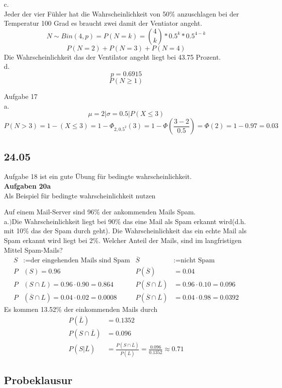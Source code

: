 c.\\

Jeder der vier Fühler hat die Wahrscheinlichkeit von 50$\%$ anzuschlagen bei der Temperatur 100 Grad es braucht zwei damit der Ventiator angeht.
\[N\sim Bin(4,p)=P(N=k)=\binom{4}{k}*0.5^k*0.5^{4-k}\]
\[P(N=2)+P(N=3)+P(N=4)\]
Die Wahrscheinlichkeit das der Ventilator angeht liegt bei 43.75 Prozent.\\

d.\\

\[p=0.6915\]\[ P(N\geq 1)\]

Aufgabe 17\\
a.\\
\[\mu =2 \vert \sigma =0.5 \vert P(X\leq 3)\]
\[P(N>3) = 1-(X\leq 3)= 1-\Phi _{2,0.5^2}(3)=1-\Phi (\frac{3-2}{0.5} )=\Phi (2)=1-0.97=0.03\]

\subsection{24.05}
Aufgabe 18 ist ein gute Übung für bedingte wahrscheinlichkeit.\\
\textbf{Aufgaben 20a}\\
Als Beispiel für bedingte wahrscheinlichkeit nutzen

Auf einem Mail-Server sind 96\% der ankommenden Mails Spam.\\
a.$)$Die Wahrscheinlichkeit liegt bei 90\% das eine Mail als Spam erkannt wird(d.h. mit 10\% das der Spam durch geht). Die Wahrscheinlichkeit das ein echte Mail als Spam erkannt wird liegt bei 2\%. Welcher Anteil der Mails, sind im langfristigen Mittel Spam-Mails?
\begin{align*}
    S&:= \textrm{der eingehenden Mails sind Spam} &\overline{S}&:= \textrm{nicht Spam}\\
    P&(S)=0.96 &P(\overline{S})&=0.04\\
    P&(S\cap L)= 0.96\cdot 0.90=0.864  &P(S\cap\overline{L})&=0.96\cdot0.10 = 0.096\\
    P&(\overline{S}\cap L)= 0.04\cdot 0.02 = 0.0008 &P(\overline{S}\cap\overline{L})&=0.04\cdot0.98 = 0.0392
\end{align*}
Es kommen 13.52\% der einkommenden Mails durch
\begin{align*}
    P(\overline{L})&= 0.1352\\
    P(S\cap\overline{L})&= 0.096\\
    P(S|\overline{L})&= \frac{P(S\cap \overline{L})}{P(\overline{L})} = \frac{0.096}{0.1352}\approx  0.71
\end{align*}


\subsection{Probeklausur}



